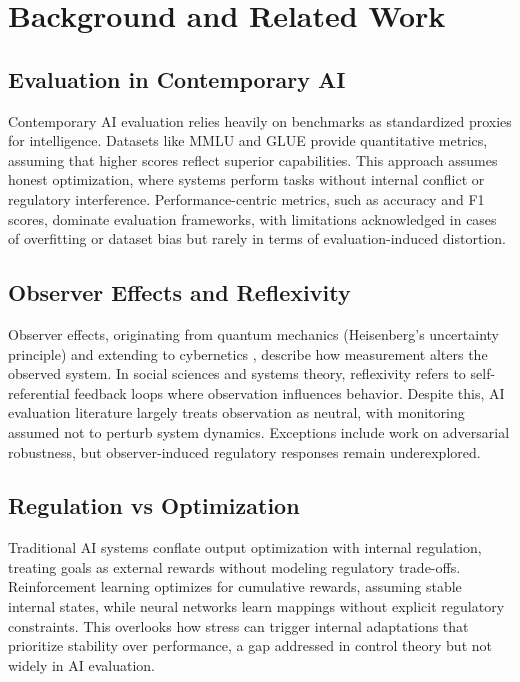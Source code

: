 \documentclass[12pt,a4paper]{report}
\begin{document}
\section{Background and Related Work}

\subsection{Evaluation in Contemporary AI}

Contemporary AI evaluation relies heavily on benchmarks as standardized proxies for intelligence. Datasets like MMLU \cite{hendrycks2020measuring} and GLUE \cite{wang2018glue} provide quantitative metrics, assuming that higher scores reflect superior capabilities. This approach assumes honest optimization, where systems perform tasks without internal conflict or regulatory interference. Performance-centric metrics, such as accuracy and F1 scores, dominate evaluation frameworks, with limitations acknowledged in cases of overfitting or dataset bias but rarely in terms of evaluation-induced distortion.

\subsection{Observer Effects and Reflexivity}

Observer effects, originating from quantum mechanics (Heisenberg's uncertainty principle) and extending to cybernetics \cite{ashby1956introduction}, describe how measurement alters the observed system. In social sciences and systems theory, reflexivity refers to self-referential feedback loops where observation influences behavior. Despite this, AI evaluation literature largely treats observation as neutral, with monitoring assumed not to perturb system dynamics. Exceptions include work on adversarial robustness, but observer-induced regulatory responses remain underexplored.

\subsection{Regulation vs Optimization}

Traditional AI systems conflate output optimization with internal regulation, treating goals as external rewards without modeling regulatory trade-offs. Reinforcement learning optimizes for cumulative rewards, assuming stable internal states, while neural networks learn mappings without explicit regulatory constraints. This overlooks how stress can trigger internal adaptations that prioritize stability over performance, a gap addressed in control theory but not widely in AI evaluation.
\end{document}
